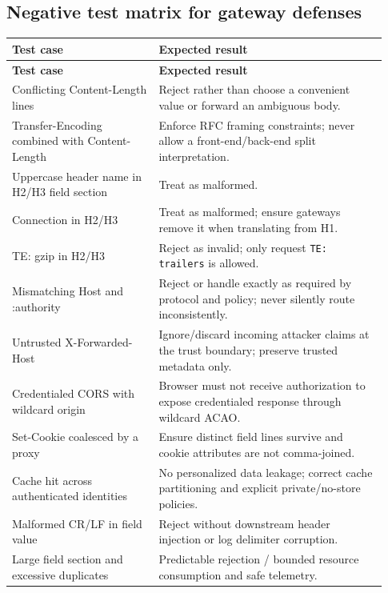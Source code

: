 \documentclass[10pt,letterpaper,oneside]{article}
\newcommand{\field}[1]{{\ttfamily\small\color{Deep}#1}}
\begin{document}
\subsection{Negative test matrix for gateway defenses}
\begin{longtable}{>{\RaggedRight\arraybackslash}p{0.36\linewidth}>{\RaggedRight\arraybackslash}p{0.57\linewidth}}
\toprule\rowcolor{Navy}\color{white}\sffamily\bfseries Test case & \color{white}\sffamily\bfseries Expected result\\\midrule\endfirsthead
\toprule\rowcolor{Navy}\color{white}\sffamily\bfseries Test case & \color{white}\sffamily\bfseries Expected result\\\midrule\endhead
Conflicting \field{Content-Length} lines & Reject rather than choose a convenient value or forward an ambiguous body.\\\midrule
\field{Transfer-Encoding} combined with \field{Content-Length} & Enforce RFC framing constraints; never allow a front-end/back-end split interpretation.\\\midrule
Uppercase header name in H2/H3 field section & Treat as malformed.\\\midrule
\field{Connection} in H2/H3 & Treat as malformed; ensure gateways remove it when translating from H1.\\\midrule
\field{TE: gzip} in H2/H3 & Reject as invalid; only request \texttt{TE: trailers} is allowed.\\\midrule
Mismatching \field{Host} and \field{:authority} & Reject or handle exactly as required by protocol and policy; never silently route inconsistently.\\\midrule
Untrusted \field{X-Forwarded-Host} & Ignore/discard incoming attacker claims at the trust boundary; preserve trusted metadata only.\\\midrule
Credentialed CORS with wildcard origin & Browser must not receive authorization to expose credentialed response through wildcard ACAO.\\\midrule
\field{Set-Cookie} coalesced by a proxy & Ensure distinct field lines survive and cookie attributes are not comma-joined.\\\midrule
Cache hit across authenticated identities & No personalized data leakage; correct cache partitioning and explicit private/no-store policies.\\\midrule
Malformed CR/LF in field value & Reject without downstream header injection or log delimiter corruption.\\\midrule
Large field section and excessive duplicates & Predictable rejection / bounded resource consumption and safe telemetry.\\\midrule
\bottomrule\end{longtable}
\end{document}
